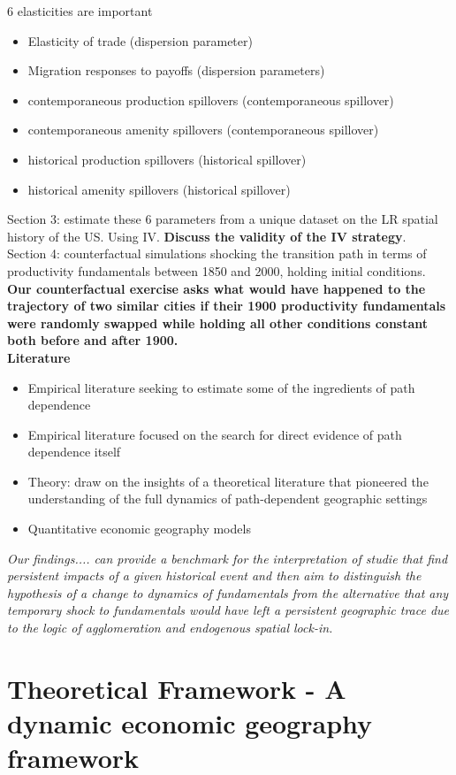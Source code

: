 \documentclass[12pt, final]{article}
\begin{document}
6 elasticities are important
\begin{itemize}
    \item Elasticity of trade (dispersion parameter)
    \item Migration responses to payoffs (dispersion parameters)
    \item contemporaneous production spillovers (contemporaneous spillover)
    \item contemporaneous amenity spillovers (contemporaneous spillover)
    \item historical production spillovers (historical spillover)
    \item historical amenity spillovers (historical spillover)
\end{itemize}
Section 3: estimate these 6 parameters from a unique dataset on the LR spatial history of the US. Using IV. \textbf{Discuss the validity of the IV strategy}. \\
Section 4: counterfactual simulations shocking the transition path in terms of productivity fundamentals between 1850 and 2000, holding initial conditions.
\\
\textbf{Our counterfactual exercise asks what would have happened  to the trajectory of two similar cities if their 1900 productivity fundamentals were randomly swapped while holding all other conditions constant both before and after 1900.}
\\
\textbf{Literature}
\begin{itemize}
    \item Empirical literature seeking to estimate some of the ingredients of path dependence 
    \item Empirical literature focused on the search for direct evidence of path dependence itself
    \item Theory: draw on the insights of a theoretical literature that pioneered the understanding of the full dynamics of path-dependent geographic settings
    \item Quantitative economic geography models
\end{itemize}
\textit{Our findings.... can provide a benchmark for the interpretation of studie that find persistent impacts of a given historical event and then aim to distinguish the hypothesis of a change to dynamics of fundamentals from the alternative that any temporary shock to fundamentals would have left a persistent geographic trace due to the logic of agglomeration and endogenous spatial lock-in.}

\section{Theoretical Framework - A dynamic economic geography framework}  %
\label{sec:theoretical_framework}
\end{document}
